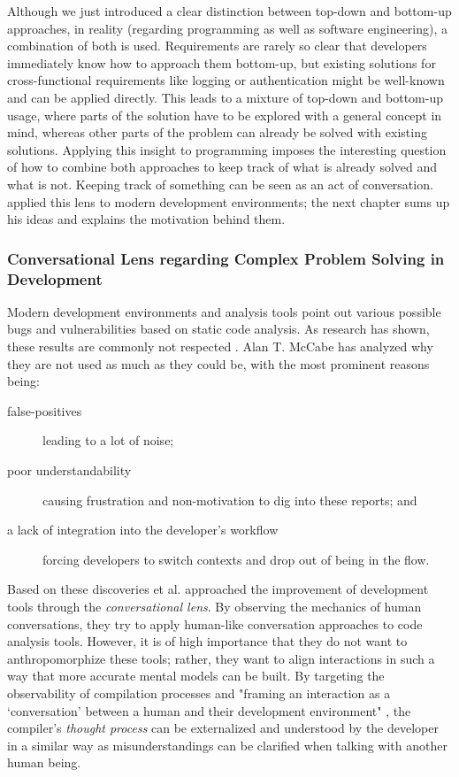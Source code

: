 Although we just introduced a clear distinction between top-down and bottom-up approaches, in reality (regarding programming as well as software engineering), a combination of both is used.
Requirements are rarely so clear that developers immediately know how to approach them bottom-up, but existing solutions for cross-functional requirements like logging or authentication might be well-known and can be applied directly.
This leads to a mixture of top-down and bottom-up usage, where parts of the solution have to be explored with a general concept in mind, whereas other parts of the problem can already be solved with existing solutions.
Applying this insight to programming imposes the interesting question of how to combine both approaches to keep track of what is already solved and what is not.
Keeping track of something can be seen as an act of conversation.
\citeauthor{mccabe_towards_2023} applied this lens to modern development environments; the next chapter sums up his ideas and explains the motivation behind them.


\subsubsection{Conversational Lens regarding Complex Problem Solving in Development}
\label{sec:conversational-lens}
Modern development environments and analysis tools point out various possible bugs and vulnerabilities based on static code analysis.
As research has shown, these results are commonly not respected \cite{mccabe_towards_2023}.
Alan T. McCabe has analyzed why they are not used as much as they could be, with the most prominent reasons being:
%
\begin{description}
\item[false-positives] leading to a lot of noise;
\item[poor understandability] causing frustration and non-motivation to dig into these reports; and
\item[a lack of integration into the developer's workflow] forcing developers to switch contexts and drop out of being in the flow.
\end{description}
%
Based on these discoveries \citeauthor{mccabe_towards_2023} et al. approached the improvement of development tools through the \emph{conversational lens}.
By observing the mechanics of human conversations, they try to apply human-like conversation approaches to code analysis tools.
However, it is of high importance that they do not want to anthropomorphize these tools; rather, they want to align interactions in such a way that more accurate mental models can be built.
By targeting the observability of compilation processes and "framing an interaction as a `conversation' between a human and their development environment" \cite{mccabe_towards_2023}, the compiler's \emph{thought process} can be externalized and understood by the developer in a similar way as misunderstandings can be clarified when talking with another human being.

